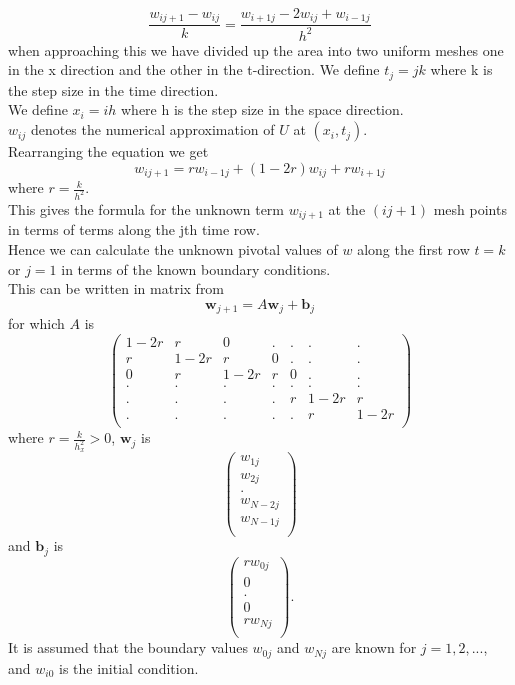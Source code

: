 \begin{equation*}
\frac{w_{ij+1}-w_{ij}}{k}=\frac{w_{i+1j}-2w_{ij}+w_{i-1j}}{h^2}
\end{equation*}
when approaching this we have divided up the area into
two uniform meshes one in the x direction and the other in the t-direction.
We define $t_j=jk$ where k is the step size in the time direction.\\
We define $x_i=ih$ where h is the step size in the space direction.\\
$w_{ij}$ denotes the numerical approximation of $U$ at $(x_i,t_j)$.\\
Rearranging the equation we get
\begin{equation}\label{disc heat}
w_{ij+1}=rw_{i-1j}+(1-2r)w_{ij}+rw_{i+1j}
\end{equation}
where $r=\frac{k}{h^2}$.\\
This gives the formula for the unknown term $w_{ij+1}$ at the $(ij+1)$ mesh points
in terms of terms along the jth time row.\\
Hence we can calculate the unknown pivotal values of $w$ along the first row $t=k$ or $j=1$ in terms of the known boundary conditions.\\
This can be written in matrix from 
\[ \mathbf{w}_{j+1}=A\mathbf{w}_{j} +\mathbf{b}_{j} \]
for which $A$ is
\[
\left(\begin{array}{ccccccc}
1-2r&r&0&.&.&.&.\\
r&1-2r&r&0&.&.&.\\
0&r&1-2r&r&0&.&.\\
.&.&.&.&.&.&.\\
.&.&.&.&r&1-2r&r\\
.&.&.&.&.&r&1-2r\\
\end{array}\right)
\]
where $r=\frac{k}{h_x^2}>0$, $\mathbf{w}_j$ is 
\[
\left(\begin{array}{c}
w_{1j}\\
w_{2j}\\
.\\
w_{N-2j}\\
w_{N-1j}\\

\end{array}\right)
\]
and $\mathbf{b}_j$ is 
\[
\left(\begin{array}{c}
rw_{0j}\\
0\\
.\\
0\\
rw_{Nj}\\
\end{array}\right).
\]
It is assumed that the boundary values $w_{0j}$ and $w_{Nj}$ are known for $j=1,2,...$, and $w_{i0}$ is the initial condition.

